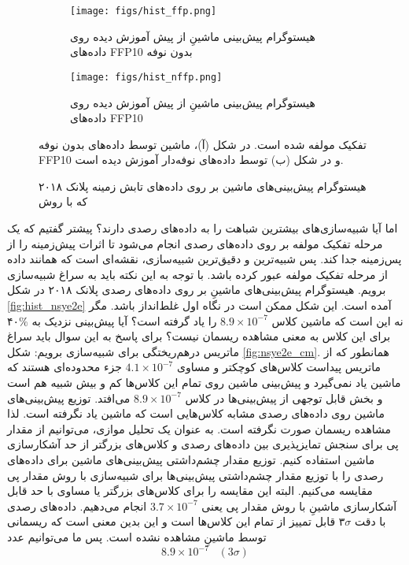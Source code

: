 \begin{figure}[hb!]
	\centering
	\begin{subfigure}{\textwidth}
		\centering
		\texttt{[image: figs/hist\_ffp.png]}
		\caption{ هیستوگرام پیش‌بینی‌ ماشینِ از پیش آموزش‌ دیده روی داده‌های  FFP10 بدون نوفه}
	\end{subfigure}%

	\begin{subfigure}{\textwidth}
		\centering
		\texttt{[image: figs/hist\_nffp.png]}
		\caption{ هیستوگرام پیش‌بینی‌ ماشینِ از پیش آموزش‌ دیده روی داده‌های  FFP10 }
	\end{subfigure}
	
	\caption{هیستوگرام پیش‌بینی‌های ماشین بر روی داده‌های تابش زمینه پلانک  
		۲۰۱۸ که با روش } تفکیک مولفه شده است. در شکل (آ)، ماشین توسط داده‌های بدون نوفه FFP10 و در شکل (ب) توسط داده‌های نوفه‌دار آموزش دیده است. 
	\label{fig:hist_ffp}
\end{figure}
اما آیا شبیه‌سازی‌های   بیشترین شباهت را به داده‌های رصدی دارند؟ پیشتر گفتیم که یک مرحله تفکیک مولفه بر روی داده‌های رصدی انجام می‌شود تا اثرات پیش‌زمینه را از پس‌زمینه جدا کند. پس شبیه‌ترین و دقیق‌ترین شبیه‌سازی‌، نقشه‌ای است که همانند داده از مرحله تفکیک مولفه عبور کرده باشد. با توجه به این نکته باید به سراغ شبیه‌سازی 
برویم. هیستوگرام پیش‌بینی‌های ماشینِ  بر روی داده‌های رصدی پلانک ۲۰۱۸ در شکل 
\ref{fig:hist_nsye2e}
آمده است. این شکل ممکن است در نگاه اول غلط‌انداز باشد. مگر نه این است که ماشین کلاس 
 $8.9\times10^{-7}$
 را یاد گرفته است؟ آیا پیش‌بینی نزدیک به $\%$۴۰ برای این کلاس به معنی مشاهده ریسمان نیست؟ برای پاسخ به این سوال باید سراغ ماتریس درهم‌ریختگی برای شبیه‌سازی 
 برویم: شکل 
 \ref{fig:nsye2e_cm}.
 همانطور که از ماتریس پیداست کلاس‌های کوچکتر و مساوی 
  $4.1\times10^{-7}$ 
 جزء محدوده‌ای هستند که ماشین یاد نمی‌گیرد و پیش‌بینی ماشین روی تمام این کلاس‌ها کم و بیش شبیه هم است و بخش قابل توجهی از پیش‌بینی‌ها در کلاس 
  $8.9\times10^{-7}$
  می‌افتد. توزیع پیش‌بینی‌های ماشین روی داده‌های رصدی مشابه کلاس‌هایی است که ماشین یاد نگرفته است. لذا مشاهده ریسمان صورت نگرفته است. به عنوان یک تحلیل موازی، می‌توانیم از مقدار پی برای سنجش تمایزپذیری بین داده‌های رصدی و کلاس‌های بزرگتر از حد آشکارسازی ماشین استفاده کنیم. توزیع مقدار چشم‌داشتی پیش‌بینی‌های ماشین برای داده‌های رصدی را با توزیع مقدار چشم‌داشتی پیش‌بینی‌ها برای شبیه‌سازی‌   با روش مقدار پی مقایسه می‌کنیم. البته این مقایسه را برای کلاس‌های  بزرگتر یا مساوی با حد قابل آشکارسازی ماشینِ   با روش مقدار پی یعنی   $3.7\times10^{-7}$ انجام می‌دهیم. داده‌های رصدی با دقت $\sigma$۳ قابل تمییز از تمام این کلاس‌ها است و این بدین معنی است که ریسمانی توسط ماشینِ   مشاهده نشده است. پس ما می‌توانیم عدد 
\begin{equation}
8.9\times10^{-7}  \; \; \;   (3\sigma) 
\end{equation}

